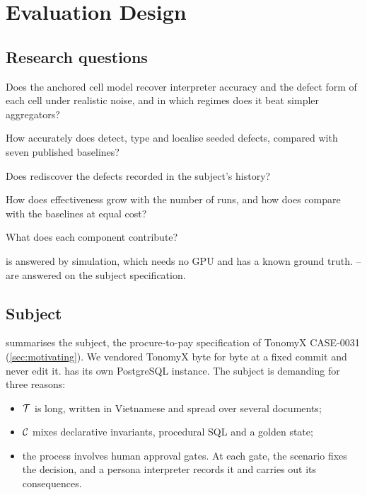 \section{Evaluation Design}
\label{sec:eval-design}

\subsection{Research questions}

\begin{description}[leftmargin=2.6em,style=nextline]
\item[\rqref{1} Identifiability in practice.] Does the anchored cell model recover interpreter accuracy and the defect form of each cell under realistic noise, and in which regimes does it beat simpler aggregators?
\item[\rqref{2} Effectiveness on seeded defects.] How accurately does \specdx detect, type and localise seeded defects, compared with seven published baselines?
\item[\rqref{3} Real defects.] Does \specdx rediscover the defects recorded in the subject's history?
\item[\rqref{4} Cost-effectiveness.] How does effectiveness grow with the number of runs, and how does \specdx compare with the baselines at equal cost?
\item[\rqref{5} Ablation.] What does each component contribute?
\end{description}

 is answered by simulation, which needs no GPU and has a known ground truth. -- are answered on the subject specification.

\subsection{Subject}
\label{sec:eval-subject}

 summarises the subject, the procure-to-pay specification of TonomyX CASE-0031 (\cref{sec:motivating}). We vendored TonomyX byte for byte at a fixed commit and never edit it. \specdx has its own PostgreSQL instance. The subject is demanding for three reasons:
\begin{itemize}[leftmargin=*]
\item $\mathcal{T}$ is long, written in Vietnamese and spread over several documents;
\item $\mathcal{C}$ mixes declarative invariants, procedural SQL and a golden state;
\item the process involves human approval gates. At each gate, the scenario fixes the decision, and a persona interpreter records it and carries out its consequences.
\end{itemize}

